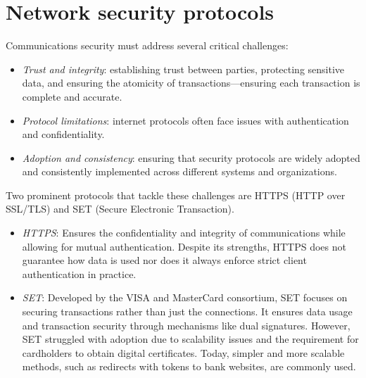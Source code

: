 \section{Network security protocols}

Communications security must address several critical challenges:
\begin{itemize}
    \item \textit{Trust and integrity}: establishing trust between parties, protecting sensitive data, and ensuring the atomicity of transactions—ensuring each transaction is complete and accurate.
    \item \textit{Protocol limitations}: internet protocols often face issues with authentication and confidentiality.
    \item \textit{Adoption and consistency}: ensuring that security protocols are widely adopted and consistently implemented across different systems and organizations.
\end{itemize}
Two prominent protocols that tackle these challenges are HTTPS (HTTP over SSL/TLS) and SET (Secure Electronic Transaction).
\begin{itemize}
    \item \textit{HTTPS}: Ensures the confidentiality and integrity of communications while allowing for mutual authentication. 
        Despite its strengths, HTTPS does not guarantee how data is used nor does it always enforce strict client authentication in practice.
    \item \textit{SET}: Developed by the VISA and MasterCard consortium, SET focuses on securing transactions rather than just the connections.
        It ensures data usage and transaction security through mechanisms like dual signatures. 
        However, SET struggled with adoption due to scalability issues and the requirement for cardholders to obtain digital certificates. 
        Today, simpler and more scalable methods, such as redirects with tokens to bank websites, are commonly used.
\end{itemize}

